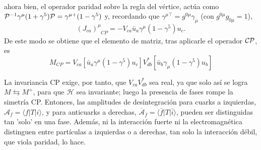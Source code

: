 \begin{subappendices}
\begin{align*}
\end{align*}
ahora bien, el operador paridad sobre la regla del vértice, actúa como 
$\mathcal{P}^{-1} \gamma^{\mu} (1+ \gamma^5) \mathcal{P} = \gamma^{\mu +} (1- \gamma^5)$ y, recordando que $\gamma^{\mu \top} = g^{0\mu} \gamma_{\mu}$ (con $g^{0 \mu} g_{0 \mu} = 1$),
\[(J_{ca})_{\phantom{\mu} CP}^{\mu} = - V_{ca} \bar{u}_a \gamma^{\mu} (1- \gamma^5) u_c.\]
De este modo se obtiene que el elemento de matriz, tras aplicarle el operador $\mathcal{CP}$, es
\[M_{CP} = V_{ca}  [\bar{u}_a \gamma^{\mu} (1-\gamma^5)  u_c ] V_{db}^* [\bar{u}_b \gamma_{\mu} (1 -\gamma^5) u_b]\]

La invariancia CP exige, por tanto, que $V_{ca} V_{db}^*$ sea real, ya que solo así se logra $M \leftrightarrows M^+$, para que $\mathcal{H}$ sea invariante; luego la presencia de fases rompe la simetría CP.
%
Entonces, las amplitudes de desintegración para cuarks a izquierdas, $\mathcal{A}_f = \langle f |T|i\rangle$, y para anticuarks a derechas, $\overline{\mathcal{A}}_{\bar{f}} = \langle \bar f |T| \bar i\rangle$, pueden ser distinguidas tan 'solo' en una fase. Además, ni la interacción fuerte ni la electromagnética distinguen entre partículas a izquierdas o a derechas, tan solo la interacción débil, que viola paridad, lo hace.

	
\end{subappendices}

